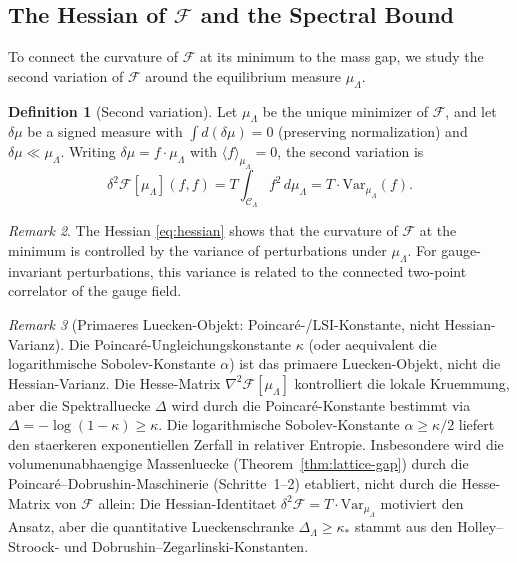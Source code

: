\documentclass[12pt,a4paper]{article}
\theoremstyle{definition}
\newtheorem{definition}{Definition}[section]
\theoremstyle{plain}
\theoremstyle{remark}
\newtheorem{remark}[definition]{Remark}
\begin{document}
\subsection{The Hessian of \texorpdfstring{$\mathcal{F}$}{F} and the Spectral Bound}

To connect the curvature of $\mathcal{F}$ at its minimum to the mass gap, we study the second variation of $\mathcal{F}$ around the equilibrium measure $\mu_\Lambda$.

\begin{definition}[Second variation]
\label{def:second-variation}
Let $\mu_\Lambda$ be the unique minimizer of $\mathcal{F}$, and let $\delta\mu$ be a signed measure with $\int d(\delta\mu) = 0$ (preserving normalization) and $\delta\mu \ll \mu_\Lambda$. Writing $\delta\mu = f \cdot \mu_\Lambda$ with $\langle f \rangle_{\mu_\Lambda} = 0$, the second variation is
\begin{equation}\label{eq:hessian}
    \delta^2 \mathcal{F}[\mu_\Lambda](f,f) = T \int_{\mathcal{C}_\Lambda} f^2\, d\mu_\Lambda = T \cdot \mathrm{Var}_{\mu_\Lambda}(f).
\end{equation}
\end{definition}

\begin{remark}
The Hessian \eqref{eq:hessian} shows that the curvature of $\mathcal{F}$ at the minimum is controlled by the variance of perturbations under $\mu_\Lambda$. For gauge-invariant perturbations, this variance is related to the connected two-point correlator of the gauge field.
\end{remark}

\begin{remark}[Primaeres Luecken-Objekt: Poincar\'e-/LSI-Konstante, nicht Hessian-Varianz]
\label{rem:primary-gap-object}
Die Poincar\'e-Ungleichungskonstante $\kappa$ (oder aequivalent die logarithmische Sobolev-Konstante $\alpha$) ist das primaere Luecken-Objekt, nicht die Hessian-Varianz. Die Hesse-Matrix $\nabla^2 \mathcal{F}[\mu_\Lambda]$ kontrolliert die lokale Kruemmung, aber die Spektralluecke $\Delta$ wird durch die Poincar\'e-Konstante bestimmt via $\Delta = -\log(1-\kappa) \geq \kappa$. Die logarithmische Sobolev-Konstante $\alpha \geq \kappa/2$ liefert den staerkeren exponentiellen Zerfall in relativer Entropie. Insbesondere wird die volumenunabhaengige Massenluecke (Theorem~\ref{thm:lattice-gap}) durch die Poincar\'e--Dobrushin-Maschinerie (Schritte~1--2) etabliert, nicht durch die Hesse-Matrix von $\mathcal{F}$ allein: Die Hessian-Identitaet $\delta^2 \mathcal{F} = T \cdot \mathrm{Var}_{\mu_\Lambda}$ motiviert den Ansatz, aber die quantitative Lueckenschranke $\Delta_\Lambda \geq \kappa_*$ stammt aus den Holley--Stroock- und Dobrushin--Zegarlinski-Konstanten.
\end{remark}
\end{document}
